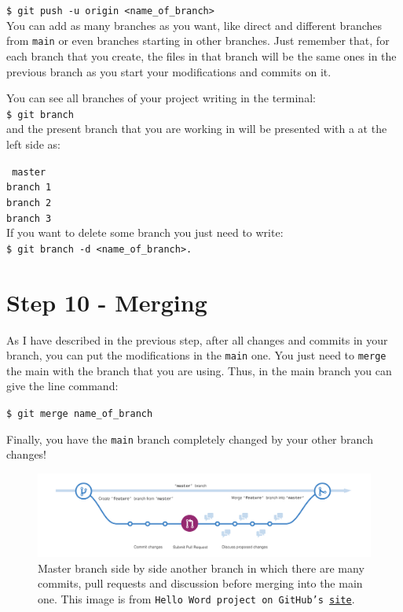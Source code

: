\documentclass[12pt,a4paper,titlepage,brazil]{article}
\begin{document}
{\texttt{\$ git push -u origin <name\_of\_branch>}\\

You can add as many branches as you want, like direct and different branches from \texttt{main} or even branches starting in other branches. Just remember that, for each branch that you create, the files in that branch will be the same ones in the previous branch as you start your modifications and commits on it.

You can see all branches of your project writing in the terminal:\\

\texttt{\$ git branch}\\

and the present branch that you are working in will be presented with a \* at the left side as:

\texttt{\* master}\\

\texttt{branch 1}\\

\texttt{branch 2}\\

\texttt{branch 3}\\

If you want to delete some branch you just need to write:\\

\texttt{\$ git branch -d <name\_of\_branch>.}


\section{Step 10 - Merging}

As I have described in the previous step, after all changes and commits in your branch, you can put the modifications in the \texttt{main} one. You just need to \texttt{merge} the main with the branch that you are using. Thus, in the main branch you can give the line command:

\texttt{\$ git merge name\_of\_branch}

Finally, you have the \texttt{main} branch completely changed by your other branch changes!

\begin{figure}[h!]
 \centering 
 \includegraphics[scale=0.24]{branching.png}
 \caption{Master branch side by side another branch in which there are many commits, pull requests and discussion before merging into the main one. This image is from \texttt{Hello Word project on GitHub's \href{https://guides.github.com/activities/hello-world/branching.png}{site}}.}
\end{figure}

}
\end{document}
